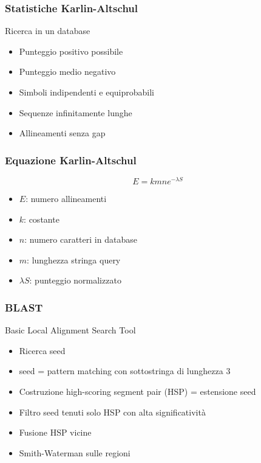 \begin{frame}[fragile]
\frametitle{Statistiche Karlin-Altschul}
\begin{block}{Ricerca in un database}
\begin{itemize}
\item
Punteggio positivo possibile
\item
Punteggio medio negativo
\item
Simboli indipendenti e equiprobabili
\item
Sequenze infinitamente lunghe
\item
Allineamenti senza gap
\end{itemize}
\end{block}
\end{frame}

\begin{frame}[fragile]
\frametitle{Equazione Karlin-Altschul}
\begin{equation*}
E=kmne^{-\lambda S}
\end{equation*}
\begin{itemize}
\item
$E$: numero allineamenti
\item
$k$: costante
\item
$n$: numero caratteri in database
\item
$m$: lunghezza stringa query
\item
$\lambda S$: punteggio normalizzato
\end{itemize}
\end{frame}

\begin{frame}[fragile]
\frametitle{BLAST}
\begin{block}{Basic Local Alignment Search Tool}
\begin{itemize}
\item
Ricerca seed
\item
seed = pattern matching con sottostringa di lunghezza $3$
\item
Costruzione  high-scoring segment pair (HSP)
= estensione seed
\item
Filtro seed tenuti solo HSP con  alta significatività
\item
Fusione HSP  vicine
\item
Smith-Waterman sulle regioni
\end{itemize}
\end{block}
\end{frame}



